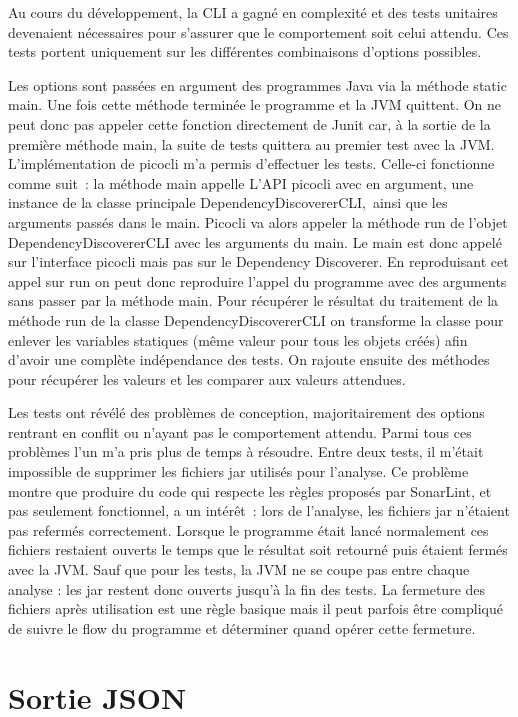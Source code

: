 \documentclass[french,a4paper,12pt]{report}
\begin{document}
Au cours du développement, la CLI a gagné en complexité et des tests unitaires devenaient nécessaires pour s’assurer que le comportement soit celui attendu. Ces tests portent uniquement sur les différentes combinaisons d’options possibles. 

Les options sont passées en argument des programmes Java via la méthode static main. Une fois cette méthode terminée le programme et la JVM quittent. On ne peut donc pas appeler cette fonction directement de Junit car, à la sortie de la première méthode main, la suite de tests quittera au premier test avec la JVM. 
L’implémentation de picocli m’a permis d’effectuer les tests. Celle-ci fonctionne comme suit : la méthode main appelle L’API picocli avec en argument, une instance de la classe principale DependencyDiscovererCLI, ainsi que les arguments passés dans le main.
Picocli va alors appeler la méthode run de l'objet DependencyDiscovererCLI avec les arguments du main. Le main est donc appelé sur l'interface picocli mais pas sur le Dependency Discoverer.
En reproduisant cet appel sur run on peut donc reproduire l’appel du programme avec des arguments sans passer par la méthode main.
Pour récupérer le résultat du traitement de la méthode run de la classe DependencyDiscovererCLI on transforme la classe pour enlever les variables statiques (même valeur pour tous les objets créés) afin d’avoir une complète indépendance des tests. On rajoute ensuite des méthodes pour récupérer les valeurs et les comparer aux valeurs attendues.

Les tests ont révélé des problèmes de conception, majoritairement des options rentrant en conflit ou n’ayant pas le comportement attendu. Parmi tous ces problèmes l'un m’a pris plus de temps à résoudre. Entre deux tests, il m’était impossible de supprimer les fichiers jar utilisés pour l’analyse. Ce problème montre que produire du code qui respecte les règles proposés par SonarLint, et pas seulement fonctionnel, a un intérêt : 
lors de l'analyse, les fichiers jar n'étaient pas refermés correctement. Lorsque le programme était lancé normalement ces fichiers restaient ouverts le temps que le résultat soit retourné puis étaient fermés avec la JVM. Sauf que pour les tests, la JVM ne se coupe pas entre chaque analyse : les jar restent donc ouverts jusqu’à la fin des tests. 
La fermeture des fichiers après utilisation est une règle basique mais il peut parfois être compliqué de suivre le flow du programme et déterminer quand opérer cette fermeture.

\section{Sortie JSON}
\end{document}
